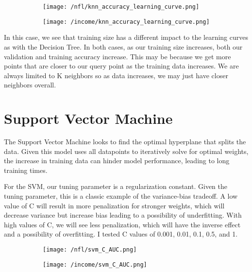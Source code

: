 \documentclass[12pt]{article}
\begin{document}
\begin{figure}[H]
\begin{subfigure}{0.5\textwidth}
\centering
\texttt{[image: /nfl/knn\_accuracy\_learning\_curve.png]}
\end{subfigure}%
\begin{subfigure}{0.5\textwidth}
\centering
\texttt{[image: /income/knn\_accuracy\_learning\_curve.png]}
\end{subfigure}
\end{figure}

In this case, we see that training size has a different impact to the learning curves as with the Decision Tree. In both cases, as our training size increases, both our validation and training accuracy increase. This may be because we get more points that are closer to our query point as the training data increases. We are always limited to K neighbors so as data increases, we may just have closer neighbors overall. 

\section{Support Vector Machine}
The Support Vector Machine looks to find the optimal hyperplane that splits the data. Given this model uses all datapoints to iteratively solve for optimal weights, the increase in training data can hinder model performance, leading to long training times.

For the SVM, our tuning parameter is a regularization constant. Given the tuning parameter, this is a classic example of the variance-bias tradeoff.  A low value of C will result in more penalization for stronger weights, which will decrease variance but increase bias leading to a possibility of underfitting.  With high values of C, we will see less penalization, which will have the inverse effect and a possibility of overfitting. I tested C values of 0.001, 0.01, 0.1, 0.5, and 1.

\begin{figure}[H]
\begin{subfigure}{0.5\textwidth}
\centering
\texttt{[image: /nfl/svm\_C\_AUC.png]}
\end{subfigure}%
\begin{subfigure}{0.5\textwidth}
\centering
\texttt{[image: /income/svm\_C\_AUC.png]}
\end{subfigure}
\end{figure}
\end{document}
